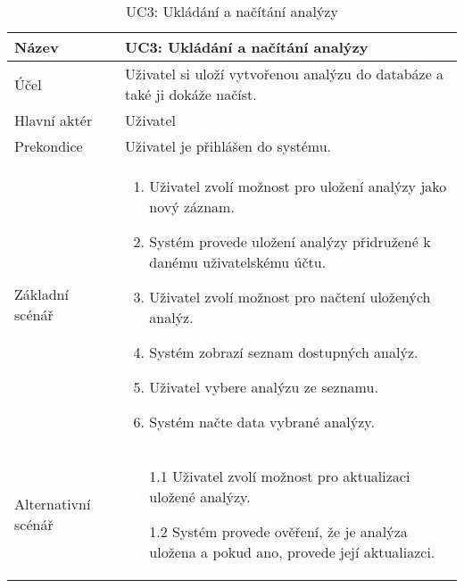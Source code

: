 \begin{table}[h]
	\caption{UC3: Ukládání a načítání analýzy}
	\label{tab:uc3}
\begin{tabular}{p{4cm} | p{12cm} }
Název & UC3: Ukládání a načítání analýzy \\ \hline
Účel &   Uživatel si uloží vytvořenou analýzu do databáze a také ji dokáže načíst. \\\hline
Hlavní aktér  & Uživatel  \\ \hline
Prekondice & Uživatel je přihlášen do systému. \\ \hline

        Základní scénář &  \begin{enumerate}
     \item Uživatel zvolí možnost pro uložení analýzy jako nový záznam.
     \item Systém provede uložení analýzy přidružené k danému uživatelskému účtu. 
     \item Uživatel zvolí možnost pro načtení uložených analýz. 
     \item Systém zobrazí seznam dostupných analýz.
     \item Uživatel vybere analýzu ze seznamu.
     \item Systém načte data vybrané analýzy. 
\end{enumerate}\\ \hline
Alternativní scénář  & 

\begin{itemize}
    \item [1.1] Uživatel zvolí možnost pro aktualizaci uložené analýzy. 
    \item [1.2] Systém provede ověření, že je analýza uložena a pokud ano, provede její aktualiazci.  
\end{itemize}
\\ \hline

\end{tabular}\  
\end{table}